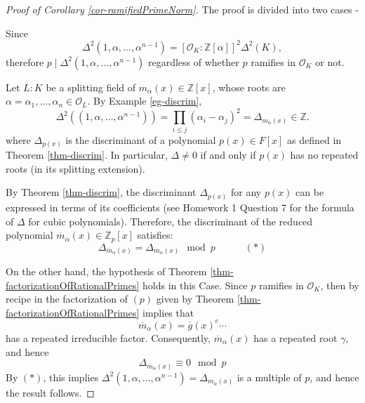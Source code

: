 \documentclass[11pt]{book}
\begin{document}
\begin{proof}[Proof of Corollary \ref{cor-ramifiedPrimeNorm}]
The proof is divided into two cases - 

\medskip
\noindent {} Since
$$
\Delta^2(1,\alpha, \dots, \alpha^{n-1}) = [\mathcal{O}_K : \mathbb{Z}[\alpha]]^2 \Delta^2(K),
$$
therefore 
$p \mid \Delta^2(1,\alpha, \dots, \alpha^{n-1})$ regardless of whether $p$ ramifies in $\mathcal{O}_K$ or not.

\medskip
\noindent {} Let $L:K$ be a splitting field of $m_{\alpha}(x) \in \mathbb{Z}[x]$, whose roots are $\alpha = \alpha_1, \dots, \alpha_n \in \mathcal{O}_L$. 
By Example \ref{eg-discrim}, 
$$\Delta^2((1,\alpha, \dots, \alpha^{n-1})) = \prod_{i \leq j} (\alpha_i - \alpha_j)^2 = \Delta_{m_{\alpha}(x)} \in \mathbb{Z}.$$
where $\Delta_{p(x)}$ is the discriminant of a polynomial $p(x) \in F[x]$ as defined in Theorem \ref{thm-discrim}. In particular, $\Delta \neq 0$ if and only if $p(x)$ has no repeated roots (in its splitting extension). 

By Theorem \ref{thm-discrim}, the discriminant $\Delta_{p(x)}$ for any $p(x)$ can be expressed in terms of its coefficients (see Homework 1 Question 7 for the formula of $\Delta$ for cubic polynomials). Therefore, the discriminant of the reduced polynomial $\overline{m}_{\alpha}(x) \in \mathbb{Z}_p[x]$ satisfies:
$$\Delta_{\overline{m}_{\alpha}(x)} = \Delta_{m_{\alpha}(x)} \mod{p} \quad \quad \quad (*)$$




On the other hand, the hypothesis of Theorem \ref{thm-factorizationOfRationalPrimes} holds in this Case. Since $p$ ramifies in $ \mathcal{O}_K$, then by recipe in the factorization of $(p)$ given by Theorem \ref{thm-factorizationOfRationalPrimes} implies that 
$$\overline{m}_{\alpha}(x) = \overline{g}(x)^{e} \cdots$$
has a repeated irreducible factor. Consequently, $\overline{m}_{\alpha}(x)$ has a repeated root $\gamma$, and hence
$$\Delta_{\overline{m}_{\alpha}(x)} \equiv 0 \mod p$$
By $(*)$, this implies $\Delta^2(1,\alpha, \dots, \alpha^{n-1}) = \Delta_{m_{\alpha}(x)}$ is a multiple of $p$, and hence the result follows.
\end{proof}
\end{document}
